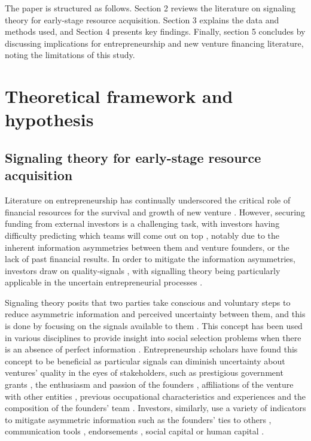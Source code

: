 \documentclass[12pt]{article}
\begin{document}
The paper is structured as follows. Section 2 reviews the literature on signaling theory for early-stage resource acquisition. Section 3 explains the data and methods used, and Section 4 presents key findings. Finally, section 5 concludes by discussing implications for entrepreneurship and new venture financing literature, noting the limitations of this study.

\section{Theoretical framework and hypothesis}

\subsection{Signaling theory for early-stage resource acquisition}

Literature on entrepreneurship has continually underscored the critical role of financial resources for the survival and growth of new venture \citep{cooper1994initial, drover2017review, klein2020start}. However, securing funding from external investors is a challenging task, with investors having difficulty predicting which teams will come out on top \citep{ghassemiautomated}, notably due to the inherent information asymmetries between them and venture founders, or the lack of past financial results. In order to mitigate the information asymmetries, investors draw on quality-signals \citep{harrer2022reducing, ko2018signaling, subramanian2022backing}, with signalling theory being particularly applicable in the uncertain entrepreneurial processes \citep{spence1978job}.

Signaling theory posits that two parties take conscious and voluntary steps to reduce asymmetric information and perceived uncertainty between them, and this is done by focusing on the signals available to them \citep{spence1974market}. This concept has been used in various disciplines to provide insight into social selection problems when there is an absence of perfect information \citep{connelly2011signaling, colombo2021use}. Entrepreneurship scholars have found this concept to be beneficial as particular signals can diminish uncertainty about ventures' quality in the eyes of stakeholders, such as prestigious government grants \citep{islam2018signaling}, the enthusiasm and passion of the founders \citep{chen2009entrepreneur}, affiliations of the venture with other entities \citep{plummer2016better}, previous occupational characteristics and experiences \citep{wu2023secrets} and the composition of the founders' team \citep{ko2018signaling}. Investors, similarly, use a variety of indicators to mitigate asymmetric information such as the founders' ties to others \citep{shane2002network}, communication tools \citep{harrer2022reducing}, endorsements \citep{courtney2017resolving, janney2006moderating, plummer2016better, gasiorowski2022pay}, social capital \citep{shane2002organizational} or human capital \citep{beckman2007early}.
\end{document}
